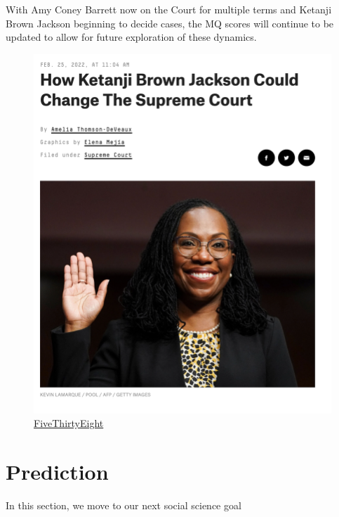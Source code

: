 \documentclass[
  letterpaper,
  DIV=11,
  numbers=noendperiod]{scrreprt}
\begin{document}
With Amy Coney Barrett now on the Court for multiple terms and Ketanji
Brown Jackson beginning to decide cases, the MQ scores will continue to
be updated to allow for future exploration of these dynamics.

\begin{figure}

{\centering \includegraphics{images/sccourtkj.png}

}

\caption{\href{https://fivethirtyeight.com/features/how-ketanji-brown-jackson-could-change-the-supreme-court/}{FiveThirtyEight}}

\end{figure}


\hypertarget{prediction}{%
\chapter{Prediction}\label{prediction}}

In this section, we move to our next social science goal
\end{document}
